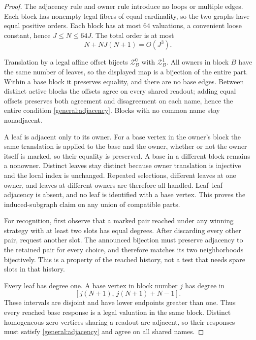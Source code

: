 \documentclass[11pt]{article}
\theoremstyle{definition}
\begin{document}
\begin{proof}
The adjacency rule and owner rule introduce no loops or multiple
edges. Each block has nonempty legal fibers of equal cardinality,
so the two graphs have equal positive orders. Each block has at
most \(64\) valuations, a convenient loose constant, hence
\(J\le N\le64J\). The total order is at most
\[
       N+NJ(N+1)=O(J^3).
\]

Translation by a legal affine offset bijects \(\mathcal Z_B^0\) with
\(\mathcal Z_B^1\). All owners in block \(B\) have the same number of
leaves, so the displayed map is a bijection of the entire part.
Within a base block it preserves equality, and there are no base
edges. Between distinct active blocks the offsets agree on every
shared readout; adding equal offsets preserves both agreement and
disagreement on each name, hence the entire condition
\eqref{general:adjacency}. Blocks with no common name stay
nonadjacent.

A leaf is adjacent only to its owner. For a base vertex in the
owner's block the same translation is applied to the base and the
owner, whether or not the owner itself is marked, so their equality
is preserved. A base in a different block remains a nonowner.
Distinct leaves stay distinct because owner translation is
injective and the local index is unchanged. Repeated selections,
different leaves at one owner, and leaves at different owners are
therefore all handled. Leaf--leaf adjacency is absent, and no leaf
is identified with a base vertex. This proves the induced-subgraph
claim on any union of compatible parts.

For recognition, first observe that a marked pair reached under
any winning strategy with at least two slots has equal degrees.
After discarding every other pair, request another slot. The
announced bijection must preserve adjacency to the retained pair
for every choice, and therefore matches its two neighborhoods
bijectively. This is a property of the reached history, not a test
that needs spare slots in that history.

Every leaf has degree one. A base vertex in block number \(j\)
has degree in
\[
       [j(N+1),\,j(N+1)+N-1].
\]
These intervals are disjoint and have lower endpoints greater
than one. Thus every reached base response is a legal valuation
in the same block. Distinct homogeneous zero vertices sharing
a readout are adjacent, so their responses must satisfy
\eqref{general:adjacency} and agree on all shared names.
\end{proof}
\end{document}
